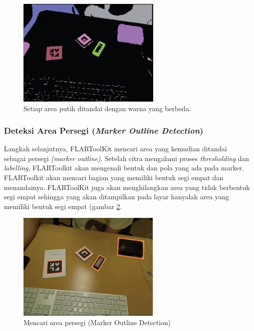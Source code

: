 \begin{figure}[h]
\begin{center}
\includegraphics[width=7cm]{./images/flartk/labelling.JPG}
\caption{\label{fig:labelling} Setiap area putih ditandai dengan warna yang berbeda.}
\end{center}
\end{figure}

\subsubsection {Deteksi Area Persegi (\textit{Marker Outline Detection})}
\label{subsubsec:outline_detection}
Langkah selanjutnya, FLARToolKit mencari area yang kemudian ditandai sebagai persegi \textit{(marker outline)}. Setelah citra mengalami proses \textit{thresholding} dan \textit{labelling}, FLARToolkit akan mengenali bentuk dan pola yang ada pada marker. FLARToolkit akan mencari bagian yang memiliki bentuk segi empat dan menandainya. FLARToolKit juga akan menghilangkan area yang tidak berbentuk segi empat sehingga yang akan ditampilkan pada layar hanyalah area yang memiliki bentuk segi empat (gambar \ref{fig:find_squares}.

\begin{figure}[h]
\begin{center}
\includegraphics[width=7cm]{./images/flartk/find_squares.JPG}
\caption{\label{fig:find_squares} Mencari area persegi (Marker Outline Detection)}
\end{center}
\end{figure} 

